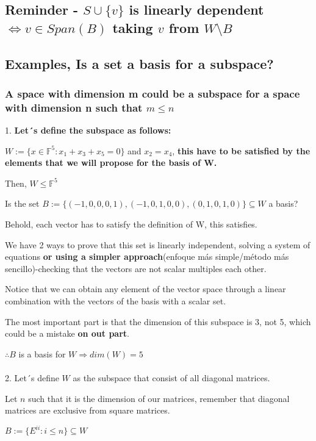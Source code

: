 \documentclass{article}
\begin{document}
\subsection*{Reminder - \(S \cup \{v\}\) is linearly dependent \(\iff v \in Span(B)\) taking \(v\) from \(W\text{\textbackslash}B\)}

\subsection*{Examples, Is a set a basis for a subspace?}

\subsubsection*{A space with dimension m could be a subspace for a space with dimension n such that \(m \leq n\)}
1. \textbf{Let´s define the subspace as follows:} 

\(W := \{x \in \mathbb{F}^5 : x_1 + x_3 + x_5 = 0\}\) and \(x_2 = x_4\), \textbf{this have to be satisfied by the elements that we will propose for the basis of W.}

Then, \(W \leq \mathbb{F}^5\)

Is the set \(B := \{(-1,0,0,0,1),(-1,0,1,0,0),(0,1,0,1,0)\} \subseteq W\) a basis? 

Behold, each vector has to satisfy the definition of W, this satisfies.

We have 2 ways to prove that this set is linearly independent, solving a system of equations \textbf{or using a simpler approach}(enfoque más simple/método más sencillo)-checking that the vectors are not scalar multiples each other.

Notice that we can obtain any element of the vector space through a linear combination with the vectors of the basis with a scalar set.

The most important part is that the dimension of this subspace is 3, not 5, which could be a mistake \textbf{on out part}.

\(\therefore B\) is a basis for \(W \Rightarrow dim(W) = 5\)
\\
\\
2. Let´s define \(W\) as the subspace that consist of all diagonal matrices.

Let \(n\) such that it is the dimension of our matrices, remember that diagonal matrices are exclusive from square matrices.

\(B :=\{E^{ii} : i \leq n\} \subseteq W\)
\end{document}
